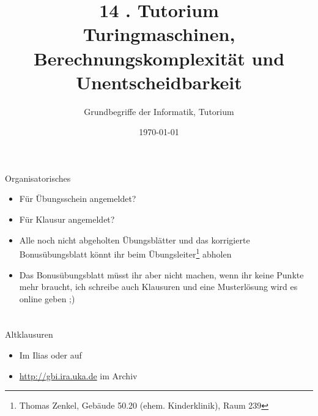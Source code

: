 




\usetikzlibrary{matrix}
\usetikzlibrary{arrows.meta}
\usetikzlibrary{automata}
\usetikzlibrary{tikzmark}

\title[Turingmaschinen]{14 . Tutorium\\ Turingmaschinen, Berechnungskomplexität und Unentscheidbarkeit}
\subtitle{Grundbegriffe der Informatik, Tutorium \hashtag\mytutnumber}
\date{\today}


\titleframe

\begin{frame}{Organisatorisches}
	\begin{itemize}
		\item Für Übungsschein angemeldet?
		\item Für Klausur angemeldet?
		\item Alle noch nicht abgeholten Übungsblätter und das korrigierte Bonusübungsblatt könnt ihr beim Übungsleiter\footnote{Thomas Zenkel, Gebäude 50.20 (ehem. Kinderklinik), Raum 239} abholen
	    \item<handout:0> Das Bonusübungsblatt müsst ihr aber nicht machen, wenn ihr keine Punkte mehr braucht, ich schreibe auch Klausuren und eine Musterlösung wird es online geben ;)
	\end{itemize}
\end{frame}

\roadmap


\def\parfunc{\dashedrightarrow}



\section{}

\begin{frame}{Altklausuren}
    \begin{itemize}
    	\item Im Ilias oder auf 
    	\item \url{http://gbi.ira.uka.de} im Archiv
    \end{itemize}
\end{frame}

